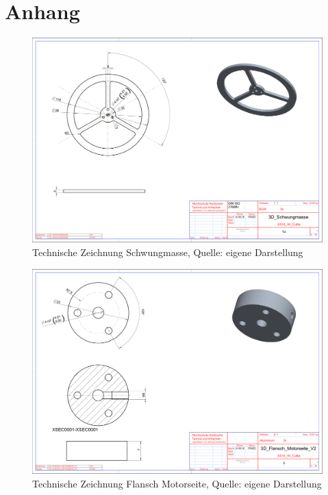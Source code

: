 \section{Anhang}

\begin{landscape}

	\begin{figure} 
	\begin{center}
	\includegraphics[width=1.5\textwidth]{img/3d_schwungmasse.pdf}
	\end{center}
	\caption{Technische Zeichnung Schwungmasse, Quelle: eigene Darstellung}
	\end{figure} 
	
	\begin{figure} 
	\begin{center}
	\includegraphics[width=1.5\textwidth]{img/3d_flansch_motorseite_v2.pdf}
	\end{center}
	\caption{Technische Zeichnung Flansch Motorseite, Quelle: eigene Darstellung}
	\end{figure} 
		

\end{landscape}
